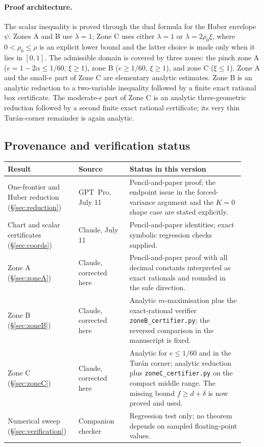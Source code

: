 \documentclass[11pt]{article}
\begin{document}
\paragraph{Proof architecture.}
The scalar inequality is proved through the dual formula for the Huber
envelope $\psi$.  Zones A and B use $\lambda=1$; Zone C uses either
$\lambda=1$ or $\lambda=2\rho_0\xi$, where $0<\rho_0\le\rho$ is an
explicit lower bound and the latter choice is made only when it lies in
$[0,1]$.
The admissible domain is covered by three zones: the pinch zone A
($e=1-2\alpha\le1/60$, $\xi\ge1$), zone B
($e\ge1/60$, $\xi\ge1$), and zone C ($\xi\le1$).  Zone A and the
small-$e$ part of Zone C are elementary analytic estimates.  Zone B is an
analytic reduction to a two-variable inequality followed by a finite exact
rational box certificate.  The moderate-$e$ part of Zone C is an analytic
three-geometric reduction followed by a second finite exact rational
certificate; its very thin Tur\'an-corner remainder is again analytic.

\subsection*{Provenance and verification status}

\begin{center}
\small
\begin{tabular}{>{\raggedright\arraybackslash}p{0.27\linewidth}
                  >{\raggedright\arraybackslash}p{0.20\linewidth}
                  >{\raggedright\arraybackslash}p{0.45\linewidth}}
\toprule
Result & Source & Status in this version \\
\midrule
One-frontier and Huber reduction (\S\ref{sec:reduction})
& GPT~Pro, July 11
& Pencil-and-paper proof; the endpoint issue in the forced-variance argument
and the $K=0$ shape case are stated explicitly. \\
Chart and scalar certificates (\S\ref{sec:coords})
& Claude, July 11
& Pencil-and-paper identities; exact symbolic regression checks supplied. \\
Zone A (\S\ref{sec:zoneA})
& Claude, corrected here
& Pencil-and-paper proof with all decimal constants interpreted as exact
rationals and rounded in the safe direction. \\
Zone B (\S\ref{sec:zoneB})
& Claude, corrected here
& Analytic $m$-maximisation plus the exact-rational verifier
\texttt{zoneB\_certifier.py}; the reversed comparison in the manuscript is fixed. \\
Zone C (\S\ref{sec:zoneC})
& Claude, corrected here
& Analytic for $e\le1/60$ and in the Tur\'an corner; analytic reduction plus
\texttt{zoneC\_certifier.py} on the compact middle range.  The missing bound
$f\ge d+\delta$ is now proved and used. \\
Numerical sweep (\S\ref{sec:verification})
& Companion checker
& Regression test only; no theorem depends on sampled floating-point values. \\
\bottomrule
\end{tabular}
\end{center}
\end{document}
